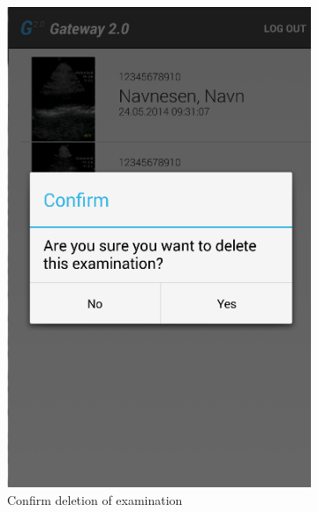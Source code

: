 \begin{figure}[H]
\centering
    \begin{subfigure}[b]{0.49\textwidth}
        \includegraphics[width=\textwidth]{img/interface/12-ConfirmDeleteExamination.png}
        \caption*{Confirm deletion of examination}
        \label{fig:12confirmdelete}
    \end{subfigure}
    \begin{subfigure}[b]{0.49\textwidth}

\end{subfigure}
\end{figure}
